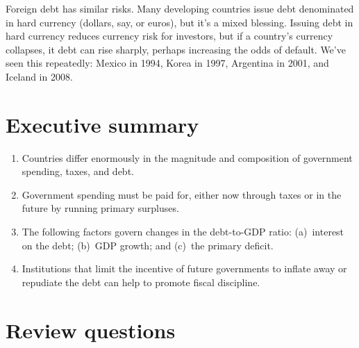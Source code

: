 \begin{itemize}
Foreign debt has similar risks.
Many developing countries issue debt denominated in hard currency
(dollars, say, or euros), but it's a mixed blessing.
Issuing debt in hard currency reduces currency risk for investors, 
but if a country's currency collapses,
it debt can rise sharply, 
perhaps increasing the odds of default.
We've seen this repeatedly:  Mexico in 1994, Korea in 1997, Argentina in 2001, 
and Iceland in 2008. 
\end{itemize}



\section*{Executive summary}

\setlength{\leftmargini}{.5\oldleftmargini}
\begin{enumerate}

\item Countries differ enormously in the magnitude and composition
of government spending, taxes, and debt.

\item Government spending must be paid for, either now through
taxes or in the future by running primary surpluses.

\item The following factors govern changes in the debt-to-GDP ratio:
(a)~interest on the debt;
(b)~GDP growth;
and (c)~the primary deficit.

\item Institutions that limit the incentive of future governments to inflate
away or repudiate the debt can help to promote fiscal discipline.

\end{enumerate}
\setlength{\leftmargini}{\oldleftmargini}

\section*{Review questions}

